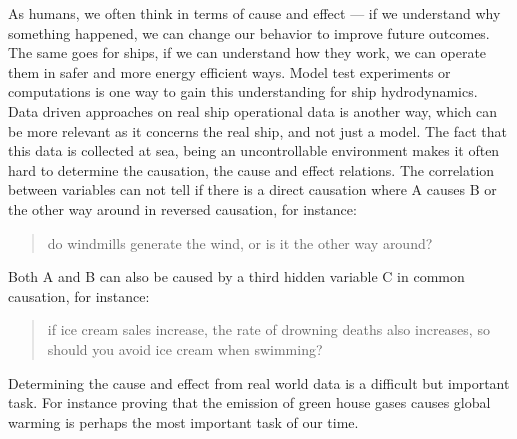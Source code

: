 As humans, we often think in terms of cause and effect — if we understand why something happened, we can change our behavior to improve future outcomes. The same goes for ships, if we can understand how they work, we can operate them in safer and more energy efficient ways. Model test experiments or computations is one way to gain this understanding for ship hydrodynamics. Data driven approaches on real ship operational data is another way, which can be more relevant as it concerns the real ship, and not just a model. The fact that this data is collected at sea, being an uncontrollable environment makes it often hard to determine the causation, the cause and effect relations. The correlation between variables can not tell if there is a direct causation where A causes B or the other way around in reversed causation, for instance:
\begin{quote}
do windmills generate the wind, or is it the other way around? 
\end{quote}

Both A and B can also be caused by a third hidden variable C in common causation, for instance:
\begin{quote}
if ice cream sales increase, the rate of drowning deaths also increases, so should you avoid ice cream when swimming? 
\end{quote}

Determining the cause and effect from real world data is a difficult but important task. For instance proving that the emission of green house gases causes global warming is perhaps the most important task of our time. 





